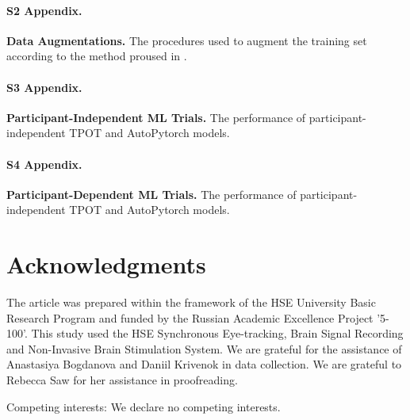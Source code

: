 \documentclass[10pt,letterpaper]{article}
\begin{document}
\paragraph*{S2 Appendix.}
\label{S2_Appendix}
{\bf Data Augmentations.} The procedures used to augment the training set according to the method proused in \cite{zhang2018word}.

\paragraph*{S3 Appendix.}
\label{S3_Appendix}
{\bf Participant-Independent ML Trials.}  The performance of participant-independent TPOT and AutoPytorch models.

\paragraph*{S4 Appendix.}
\label{S4_Appendix}
{\bf Participant-Dependent ML Trials.}  The performance of participant-independent TPOT and AutoPytorch models.

\section*{Acknowledgments}

The article was prepared within the framework of the HSE University Basic Research Program and funded by the Russian Academic Excellence Project '5-100'. This study used the HSE Synchronous Eye-tracking, Brain Signal Recording and Non-Invasive Brain Stimulation System. We are grateful for the assistance of Anastasiya Bogdanova and Daniil Krivenok in data collection. We are grateful to Rebecca Saw for her assistance in proofreading.

Competing interests: We declare no competing interests.

%
\end{document}
